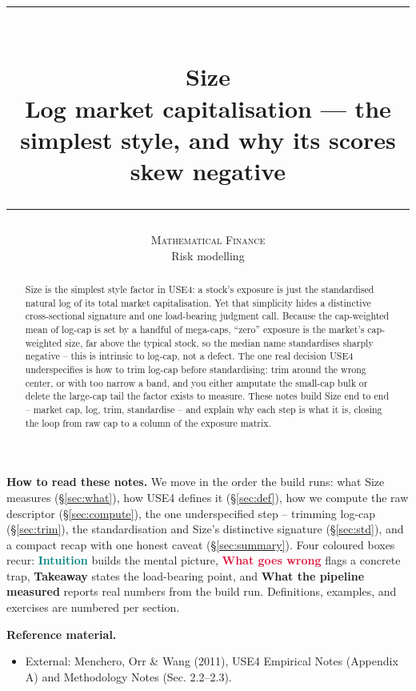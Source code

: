 \documentclass[11pt]{article}
\title{\vspace{-2.2em}
  {\color{steel}\rule{\textwidth}{1.3pt}}\\[0.7em]
  \Huge\bfseries Size\\[0.35em]
  \large\mdseries Log market capitalisation --- the simplest style, and why its scores skew negative\\[0.4em]
  {\color{steel}\rule{\textwidth}{0.7pt}}}
\author{\textsc{Mathematical Finance}\\[0.2em]
  \small Risk modelling}
\date{}
\theoremstyle{definition}
\theoremstyle{plain}
\theoremstyle{remark}
\begin{document}
\maketitle
\thispagestyle{empty}

\begin{abstract}
Size is the simplest style factor in USE4: a stock's exposure is just the standardised natural log of its total market capitalisation. Yet that simplicity hides a distinctive cross-sectional signature and one load-bearing judgment call. Because the cap-weighted mean of log-cap is set by a handful of mega-caps, ``zero'' exposure is the market's cap-weighted size, far above the typical stock, so the median name standardises sharply negative -- this is intrinsic to log-cap, not a defect. The one real decision USE4 underspecifies is how to trim log-cap before standardising: trim around the wrong center, or with too narrow a band, and you either amputate the small-cap bulk or delete the large-cap tail the factor exists to measure. These notes build Size end to end -- market cap, log, trim, standardise -- and explain why each step is what it is, closing the loop from raw cap to a column of the exposure matrix.
\end{abstract}

\begin{tcolorbox}[colback=paperlt,colframe=ink!30,boxrule=0.4pt,arc=2pt,left=10pt,right=10pt,top=8pt,bottom=8pt]
\textbf{How to read these notes.} We move in the order the build runs: what Size measures (\S\ref{sec:what}), how USE4 defines it (\S\ref{sec:def}), how we compute the raw descriptor (\S\ref{sec:compute}), the one underspecified step -- trimming log-cap (\S\ref{sec:trim}), the standardisation and Size's distinctive signature (\S\ref{sec:std}), and a compact recap with one honest caveat (\S\ref{sec:summary}). Four coloured boxes recur: \textcolor{teal}{\textbf{Intuition}} builds the mental picture, \textcolor{crimson}{\textbf{What goes wrong}} flags a concrete trap, \textcolor{amber}{\textbf{Takeaway}} states the load-bearing point, and \textcolor{steel}{\textbf{What the pipeline measured}} reports real numbers from the build run. Definitions, examples, and exercises are numbered per section.

\smallskip
\textbf{Reference material.}
\begin{itemize}[leftmargin=1.4em,topsep=2pt,itemsep=1pt]
  \item External: Menchero, Orr \& Wang (2011), USE4 Empirical Notes (Appendix A) and Methodology Notes (Sec. 2.2--2.3).
\end{itemize}
\end{tcolorbox}
\end{document}
